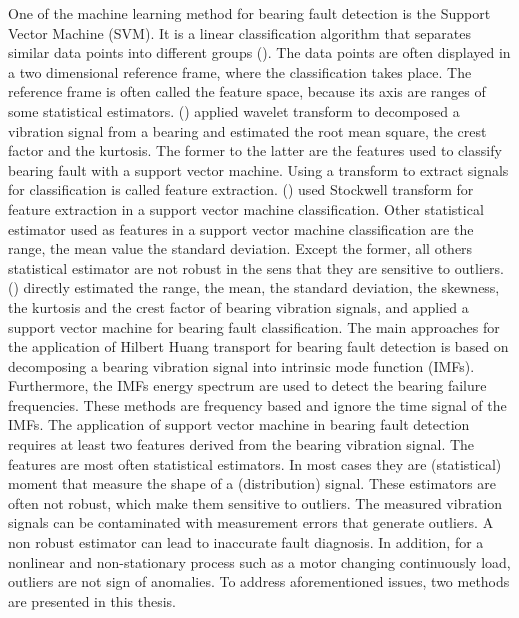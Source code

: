 \documentclass[../Main/thesis.tex]{subfiles}
\begin{document}
\justify
One of the machine learning method for bearing fault detection is the Support Vector Machine (SVM). It is a linear classification algorithm that separates similar data points into different groups (\cite{vapnik1995}). The data points are  often displayed in a two dimensional reference frame, where the classification takes place. The reference frame is often called the feature space, because its axis are ranges of some statistical estimators. (\cite{konar2011}) applied wavelet transform to decomposed a vibration signal from a bearing and estimated the root mean square, the crest factor and the kurtosis. The former to the latter are the features used to classify bearing fault with a support vector machine. Using a transform to extract signals for classification is called feature extraction. (\cite{singh2018}) used Stockwell transform for feature extraction in a support vector machine classification. Other statistical estimator used as features in a support vector machine classification are the range, the mean value the standard deviation. Except the former, all others statistical estimator are not robust in the sens that they are sensitive to outliers. (\cite{kankar2010}) directly estimated the range, the mean, the standard deviation, the skewness, the kurtosis and the crest factor of bearing vibration signals, and applied a support vector machine for bearing fault classification.
\justify
The main approaches for the application of Hilbert Huang transport for bearing fault detection is based on decomposing a bearing vibration signal into intrinsic mode function (IMFs). Furthermore, the IMFs energy spectrum are used to detect the bearing failure frequencies. These methods are frequency based and ignore the time signal of the IMFs.
\justify
The application of support vector machine in bearing fault detection requires at least two features derived from the bearing vibration signal. The features are most often statistical estimators. In most cases they are (statistical) moment that measure the shape of a (distribution) signal. These estimators are often not robust, which make them sensitive to outliers. The measured vibration signals can be contaminated with measurement errors that generate outliers. A non robust estimator can lead to inaccurate fault diagnosis. In addition, for a nonlinear and non-stationary process such as a motor changing continuously load, outliers are not sign of anomalies. To address aforementioned issues, two methods are presented in this thesis. 
\end{document}
